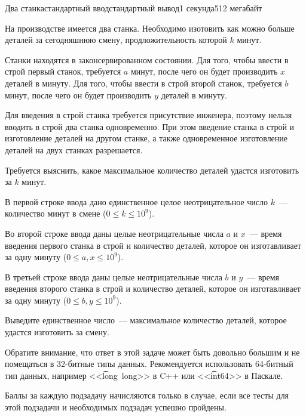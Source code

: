 \begin{problem}{Два станка}{стандартный ввод}{стандартный вывод}{1 секунда}{512 мегабайт}

На производстве имеется два станка. Необходимо изотовить как можно больше деталей за сегодняшнюю смену, продложительность которой $k$ минут.

Станки находятся в законсервированном состоянии. Для того, чтобы ввести в строй первый станок, требуется $a$ минут, после чего он будет производить $x$ деталей в минуту. Для того, чтобы ввести в строй второй станок, требуется $b$ минут, после чего он будет производить $y$ деталей в минуту.

Для введения в строй станка требуется присутствие инженера, поэтому нельзя вводить в строй два станка одновременно. При этом введение станка в строй и изготовление деталей на другом станке, а также одновременное изготовление деталей на двух станках разрешается.

Требуется выяснить, какое максимальное количество деталей удастся изготовить за $k$ минут.

\InputFile
В первой строке ввода дано единственное целое неотрицательное число $k$~--- количество минут в смене ($0 \le k \le 10^9$).

Во второй строке ввода даны целые неотрицательные числа $a$ и $x$~--- время введения первого станка в строй и количество деталей, которое он изготавливает за одну минуту ($0 \le a, x \le 10^9$).

В третьей строке ввода даны целые неотрицательные числа $b$ и $y$~--- время введения второго станка в строй и количество деталей, которое он изготавливает за одну минуту ($0 \le b, y \le 10^9$).


\OutputFile
Выведите единственное число~--- максимальное количество деталей, которое удастся изготовить за смену.

Обратите внимание, что ответ в этой задаче может быть довольно большим и не помещаться в 32-битные типы данных. Рекомендуется использовать 64-битный тип данных, например <<\t{\mbox{long long}}>> в C++ или <<\t{int64}>> в Паскале.

\Scoring
Баллы за каждую подзадачу начисляются только в случае, если все тесты для этой
подзадачи и необходимых подзадач успешно пройдены.


\end{problem}
